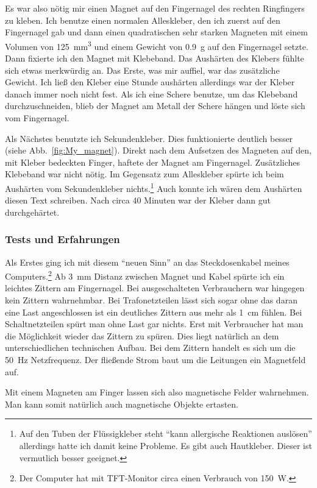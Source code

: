 Es war also nötig mir einen Magnet auf den Fingernagel des rechten Ringfingers zu kleben. Ich
benutze einen normalen Alleskleber, den ich zuerst auf den Fingernagel gab und dann einen
quadratischen sehr starken Magneten mit einem Volumen von \SI{125}{\cubic\milli\metre}
und einem Gewicht von \SI{0,9}{\gram} auf den
Fingernagel setzte. Dann fixierte ich den Magnet mit Klebeband. Das Aushärten des Klebers fühlte
sich etwas merkwürdig an. Das Erste, was mir auffiel, war das zusätzliche Gewicht. Ich ließ den
Kleber eine Stunde aushärten allerdings war der Kleber danach immer noch nicht fest. Als ich eine
Schere benutze, um das Klebeband durchzuschneiden, blieb der Magnet am Metall der Schere hängen und
löste sich vom Fingernagel.

Als Nächstes benutzte ich Sekundenkleber. Dies funktionierte deutlich besser
(siehe Abb.~\vref{fig:My_magnet}).
Direkt nach dem
Aufsetzen des Magneten auf den, mit Kleber bedeckten Finger, haftete der Magnet am Fingernagel.
Zusätzliches Klebeband war nicht nötig. Im Gegensatz zum Alleskleber spürte ich beim Aushärten vom
Sekundenkleber nichts.\footnote{Auf den Tuben der Flüssigkleber steht \enquote{kann
allergische Reaktionen auslösen} allerdings hatte ich damit keine Probleme. Es gibt
auch Hautkleber. Dieser ist vermutlich besser geeignet.} Auch konnte ich wären dem Aushärten
diesen Text schreiben. Nach circa 40 Minuten war der Kleber dann gut durchgehärtet.

\subsubsection{Tests und Erfahrungen}
Als Erstes ging ich mit diesem \enquote{neuen Sinn} an das Steckdosenkabel meines
Computers.\footnote{Der Computer hat mit TFT-Monitor circa einen Verbrauch von \SI{150}{\watt}.} Ab
\SI{3}{\milli\metre} Distanz zwischen Magnet und Kabel spürte ich ein leichtes Zittern am
Fingernagel. Bei ausgeschalteten Verbrauchern war hingegen kein Zittern wahrnehmbar. Bei
Trafonetzteilen lässt sich sogar ohne das daran eine Last angeschlossen ist ein deutliches Zittern
aus mehr als \SI{1}{\centi\metre} fühlen. Bei Schaltnetzteilen spürt man ohne Last gar nichts. Erst
mit Verbraucher hat man die Möglichkeit wieder das Zittern zu spüren. Dies liegt natürlich an dem
unterschiedlichen technischen Aufbau. Bei dem Zittern handelt es sich um die \SI{50}{\hertz}
Netzfrequenz. Der fließende Strom baut um die Leitungen ein Magnetfeld auf.

Mit einem Magneten am Finger lassen sich also magnetische Felder wahrnehmen. Man kann somit natürlich
auch magnetische Objekte ertasten.

